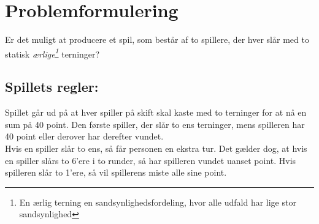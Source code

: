 \chapter{Problemformulering}
Er det muligt at producere et spil, som består af to spillere, der hver slår med to statisk \textit{ærlige\footnote{En ærlig terning en sandsynlighedsfordeling, hvor alle udfald har lige stor sandsynlighed}} terninger?
\section*{Spillets regler:}

    Spillet går ud på at hver spiller på skift skal kaste med to terninger for at nå en sum på 40 point.
    Den første spiller, der slår to ens terninger, mens spilleren har 40 point eller derover har derefter vundet.
    \\ Hvis en spiller slår to ens, så får personen en ekstra tur.
    Det gælder dog, at hvis en spiller slårs to 6'ere i to runder, så har spilleren vundet uanset point.
    Hvis spilleren slår to 1'ere, så vil spillerens miste alle sine point.
